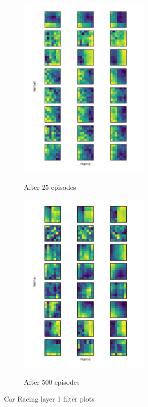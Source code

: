 \begin{figure}[H]
  \captionsetup[subfigure]{justification=centering}
  \centering
  \begin{subfigure}{0.44\linewidth}
    {\includegraphics[height=9cm]{figures/images/car_racing_filters_25.png}}
    \caption{After 25 episodes}
  \end{subfigure}
  \hfill
  \begin{subfigure}{0.44\linewidth}
    {\includegraphics[height=9cm]{figures/images/car_racing_filters_500.png}}
    \caption{After 500 episodes}
  \end{subfigure}
  \caption[Car Racing filter plots]{Car Racing layer 1 filter plots}
  \label{fig:car_racing_filter_viz}
\end{figure}
